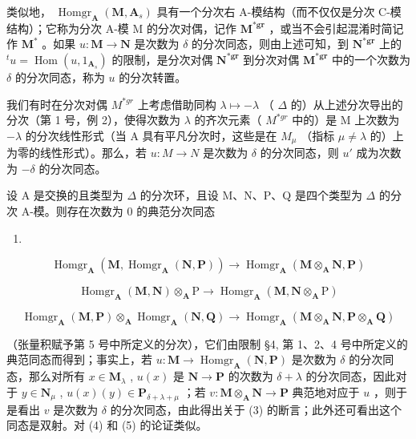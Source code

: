 类似地， \(\operatorname{Homgr}_{\mathbf{A}}(\mathbf{M}, \mathbf{A}_s)\) 具有一个分次右 A-模结构（而不仅仅是分次 C-模结构）；它称为分次 A-模 M 的分次对偶，记作 \(\mathbf{M}^{*\mathbf{gr}}\) ，或当不会引起混淆时简记作 \(\mathbf{M}^*\) 。如果 \(u: \mathbf{M} \to \mathbf{N}\) 是次数为 \(\delta\) 的分次同态，则由上述可知，到 \(\mathbf{N}^{*\mathbf{gr}}\) 上的 \(^t u = \operatorname{Hom}(u, 1_{\mathbf{A}_s})\) 的限制，是分次对偶 \(\mathbf{N}^{*\mathbf{gr}}\) 到分次对偶 \(\mathbf{M}^{*\mathbf{gr}}\) 中的一个次数为 \(\delta\) 的分次同态，称为 \(u\) 的分次转置。

我们有时在分次对偶 \(M^{*gr}\) 上考虑借助同构 \(\lambda\mapsto-\lambda\) （ \(\Delta\) 的）从上述分次导出的分次（第 1 号，例 2），使得次数为 \(\lambda\) 的齐次元素（ \(M^{*gr}\) 中的）是 M 上次数为 \(-\lambda\) 的分次线性形式（当 A 具有平凡分次时，这些是在 \(M_{\mu}\) （指标 \(\mu\neq\lambda\) 的）上为零的线性形式）。那么，若 \(u:M\to N\) 是次数为 \(\delta\) 的分次同态，则 \(u'\) 成为次数为 \(-\delta\) 的分次同态。

设 A 是交换的且类型为 \(\Delta\) 的分次环，且设 M、N、P、Q 是四个类型为 \(\Delta\) 的分次 A-模。则存在次数为 0 的典范分次同态

\begin{enumerate}
\def\labelenumi{(\arabic{enumi})}
\setcounter{enumi}{2}
\tightlist
\item
\end{enumerate}

\[
\operatorname{Homgr} _ {\mathbf {A}} (\mathbf {M}, \operatorname{Homgr} _ {\mathbf {A}} (\mathbf {N}, \mathbf {P})) \rightarrow \operatorname{Homgr} _ {\mathbf {A}} (\mathbf {M} \otimes_ {\mathbf {A}} \mathbf {N}, \mathbf {P})\tag{4}
\]

\[
\operatorname{Homgr} _ {\mathbf {A}} (\mathbf {M}, \mathbf {N}) \otimes_ {\mathbf {A}} \mathrm{P} \rightarrow \operatorname{Homgr} _ {\mathbf {A}} (\mathbf {M}, \mathbf {N} \otimes_ {\mathbf {A}} \mathrm{P})
\]

\[
\operatorname{Homgr} _ {\mathbf {A}} (\mathbf {M}, \mathbf {P}) \otimes_ {\mathbf {A}} \operatorname{Homgr} _ {\mathbf {A}} (\mathbf {N}, \mathbf {Q}) \rightarrow \operatorname{Homgr} _ {\mathbf {A}} (\mathbf {M} \otimes_ {\mathbf {A}} \mathbf {N}, \mathbf {P} \otimes_ {\mathbf {A}} \mathbf {Q}) \tag {5}
\]

（张量积赋予第 5 号中所定义的分次），它们由限制 §4, 第 1、2、4 号中所定义的典范同态而得到；事实上，若 \(u: \mathbf{M} \to \operatorname{Homgr}_{\mathbf{A}}(\mathbf{N}, \mathbf{P})\) 是次数为 \(\delta\) 的分次同态，那么对所有 \(x \in \mathbf{M}_{\lambda}\) , \(u(x)\) 是 \(\mathbf{N} \to \mathbf{P}\) 的次数为 \(\delta + \lambda\) 的分次同态，因此对于 \(y \in \mathbf{N}_{\mu}\) , \(u(x)(y) \in \mathbf{P}_{\delta + \lambda + \mu}\) ；若 \(v: \mathbf{M} \otimes_{\mathbf{A}} \mathbf{N} \to \mathbf{P}\) 典范地对应于 \(u\) ，则于是看出 \(v\) 是次数为 \(\delta\) 的分次同态，由此得出关于 (3) 的断言；此外还可看出这个同态是双射。对 (4) 和 (5) 的论证类似。

